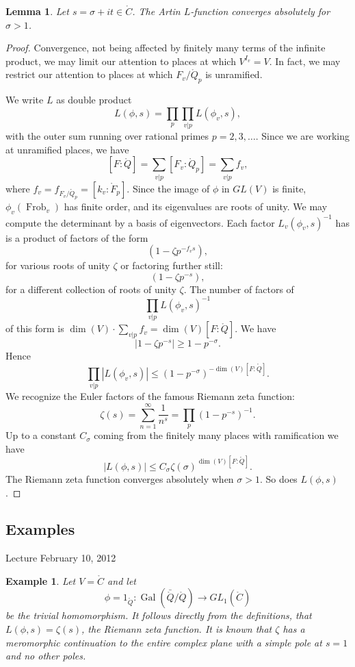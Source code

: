 \documentclass{amsart}
\newtheorem{lemma}[equation]{Lemma}
\newtheorem{example}[exercise]{Example}
\def\abs#1{{|#1|}}
\def\op#1{{\operatorname{#1}}}
\def\CC{\ring{C}}
\def\oG{\op{Gal}}
\begin{document}
\begin{lemma} Let $s = \sigma+i t\in\CC$.  The Artin $L$-function converges
absolutely for $\sigma >1$.
\end{lemma}

\begin{proof}  Convergence, not being affected by finitely many terms of the
infinite product, we
may limit our attention to places at which $V^{I_v}=V$.  In fact, we may restrict
our attention to places at which $F_v/\ring{Q}_p$ is unramified.

We write $L$ as double product
\[
L(\phi,s) = \prod_p \prod_{v|p} L(\phi_v,s),
\]
with the outer sum running over rational primes $p=2,3,\ldots$.
Since we are working at unramified places, we have
\[
[F:\ring{Q}] = \sum_{v|p} [F_v:\ring{Q}_p] = \sum_{v|p} f_v,
\]
where $f_v = f_{F_v/\ring{Q}_p}=[k_v:\ring{F}_p]$.
Since the image of $\phi$ in $GL(V)$ is finite, $\phi_v(\op{Frob}_v)$ has
finite order, and its eigenvalues are roots of unity.  We may compute the
determinant by a basis of eigenvectors.  Each factor $L_v(\phi_v,s)^{-1}$ has
is a product of factors of the form
\[
(1 - \zeta p^{-f_v s}),
\]
for various roots of unity $\zeta$
or factoring further still:
\[
(1 - \zeta p^{-s}),
\]
for a different collection of roots of unity $\zeta$.
The number of factors of 
\[
\prod_{v|p} L(\phi_v,s)^{-1}
\]
of this form is $\dim(V)\cdot\sum_{v|p} f_v = \dim(V)[F:\ring{Q}]$.
We have
\[
\abs{1 - \zeta p^{-s}} \ge 1 - p^{-\sigma}.
\]
Hence
\[
\prod_{v|p} \abs{L(\phi_v,s)} \le (1 - p^{-\sigma})^{-\dim(V)[F:\ring{Q}]}.
\]
We recognize the Euler factors of the famous Riemann zeta function:
\[
\zeta(s) = \sum_{n=1}^\infty \frac{1}{n^s} = \prod_p (1-p^{-s})^{-1}.
\]
Up to a constant $C_\sigma$ coming from the finitely many
places with ramification we have
\[
\abs{L(\phi,s)} \le C_\sigma \zeta(\sigma)^{\dim(V)[F:\ring{Q}]}.
\]
The Riemann zeta function converges absolutely when $\sigma>1$.  
So does $L(\phi,s)$.
\end{proof}

\subsection{Examples}

Lecture February 10, 2012

\begin{example} Let $V=\CC$ and let 
\[
\phi={1}_{\ring{Q}}:\oG(\bar{\ring{Q}}/\ring{Q})\to GL_1(\CC)
\]
be the trivial homomorphism.  It follows directly from the definitions,
that $L(\phi,s) = \zeta(s)$, the Riemann zeta function.  It is known
that $\zeta$ has a meromorphic continuation to the entire complex plane
with a simple pole at $s=1$ and no other poles.
\end{example}
\end{document}
